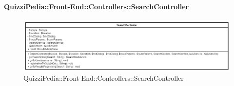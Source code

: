 \paragraph{QuizziPedia::Front-End::Controllers::SearchController}
\begin{figure} [ht]
	\centering
	\includegraphics[scale=0.5]{UML/Classi/Front-End/QuizziPedia_Front-end_Controller_SearchController.png}
	\caption{QuizziPedia::Front-End::Controllers::SearchController}
\end{figure} \FloatBarrier
